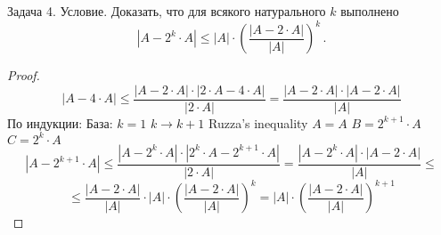 \documentclass[a4paper,12pt]{article}
\numberwithin{equation}{section}
\theoremstyle{plain}
\theoremstyle{definition}
\theoremstyle{remark}
\begin{document}
Задача 4. \newline
Условие. Доказать, что для всякого натурального $k$ выполнено
$$
|A-2^{k} \cdot A| \le |A| \cdot \left( \frac{|A-2\cdot A|}{|A|} \right)^k \,.
$$
\begin{proof}
$$|A - 4 \cdot A| \leq \frac{|A-2 \cdot A| \cdot |2 \cdot A - 4 \cdot A|}{|2 \cdot A|} = \frac{|A-2\cdot A| \cdot |A-2\cdot A|}{|A|}$$
По индукции: \newline
База: $k=1$ \newline
$k \rightarrow k+1$ \newline
Ruzza's inequality \newline
$A=A$ \newline
$B=2^{k+1} \cdot A$ \newline
$C = 2^k \cdot A$ \newline
$$|A-2^{k+1}\cdot A| \leq \frac{|A-2^k\cdot A|\cdot |2^k\cdot A-2^{k+1}\cdot A|}{|2\cdot A|} = \frac{|A-2^k\cdot A|\cdot |A-2\cdot A|}{|A|} \leq$$ \newline $$\leq \frac{|A-2\cdot A|}{|A|} \cdot |A| \cdot (\frac{|A-2\cdot A|}{|A|})^k = |A|\cdot (\frac{|A-2\cdot A|}{|A|})^{k+1}$$
\end{proof}
\end{document}
